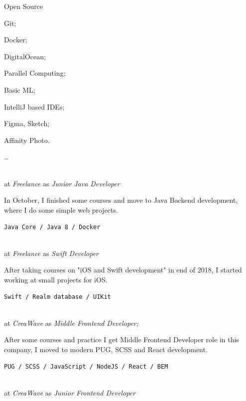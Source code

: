 \SmallSep

\begin{multicols}{3}
	\begin{compactitem}[\color{Cyan}$\circ$]
		\item Open Source \heart\
		\item Git;
		\item Docker;
		\item DigitalOcean;
		\item Parallel Computing;
		\item Basic ML;
		\item IntelliJ based IDEs;
		\item Figma, Sketch;
		\item Affinity Photo.
		\item \ldots
	\end{compactitem}
\end{multicols}

\Sep




 \\
at \textit{Freelance}
as \textit{Junior Java Developer}
\SmallSep

In October, I finished some courses and move to Java Backend development, where I do some simple web projects.
\SmallSep

\texttt{Java Core / Java 8 / Docker}
\SmallSep

 \\
at \textit{Freelance}
as \textit{Swift Developer}
\SmallSep

After taking courses on "iOS and Swift development" in end of 2018, I started working at small projects for iOS.
\SmallSep

\texttt{Swift / Realm database / UIKit}
\SmallSep

 \\
at \textit{CreaWave}
as \textit{Middle Frontend Developer;}
\SmallSep

After some courses and practice I get Middle Frontend Developer role in this company, I moved to modern PUG, SCSS and React development.
\SmallSep

\texttt{PUG / SCSS / JavaScript / NodeJS / React / BEM }
\SmallSep

 \\
at \textit{CreaWave}
as \textit{Junior Frontend Developer}
\SmallSep

